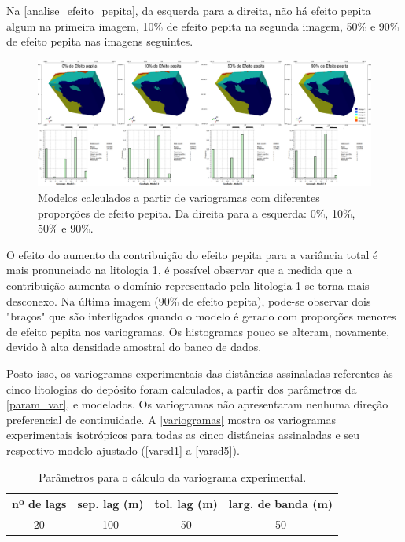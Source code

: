 Na \autoref{analise_efeito_pepita}, da esquerda para a direita, não há efeito pepita algum na primeira imagem, 10\% de efeito pepita na segunda imagem, 50\% e 90\% de efeito pepita nas imagens seguintes.

\begin{figure}[!htb]
	\caption{\label{analise_efeito_pepita}Modelos calculados a partir de variogramas com diferentes proporções de efeito pepita. Da direita para a esquerda: 0\%, 10\%, 50\% e 90\%.}
	\begin{center}
		\includegraphics[width=\textwidth]{estudo_de_caso/efeito_pepita}
	\end{center}
\end{figure}

O efeito do aumento da contribuição do efeito pepita para a variância total é mais pronunciado na litologia 1, é possível observar que a medida que a contribuição aumenta o domínio representado pela litologia 1 se torna mais desconexo. Na última imagem (90\% de efeito pepita), pode-se observar dois "braços" que são interligados quando o modelo é gerado com proporções menores de efeito pepita nos variogramas. Os histogramas pouco se alteram, novamente, devido à alta densidade amostral do banco de dados.

Posto isso, os variogramas experimentais das distâncias assinaladas referentes às cinco litologias do depósito foram calculados, a partir dos parâmetros da \autoref{param_var}, e modelados. Os variogramas não apresentaram nenhuma direção preferencial de continuidade. A \autoref{variogramas} mostra os variogramas experimentais isotrópicos para todas as cinco distâncias assinaladas e seu respectivo modelo ajustado (\autoref{varsd1} a \autoref{varsd5}).

\begin{table}[!ht]
\centering
\caption{Parâmetros para o cálculo da variograma experimental.}
\label{param_var}
\begin{tabular}{cccc}
nº de lags & sep. lag (m) & tol. lag (m) & larg. de banda (m) \\ \hline
20         & 100      & 50       & 50             \\ \hline
\end{tabular}
\end{table}

